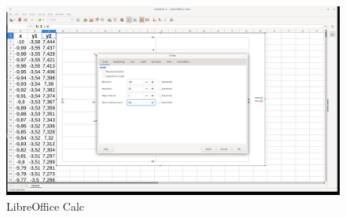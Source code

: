 \begin{figure}[h!]		
	\centering
   	\includegraphics[width=8.0in]{pictures/picture_019.png}
  	\caption{LibreOffice Calc}
   	\label{fig:LibreOfficeCalc019}
\end{figure}